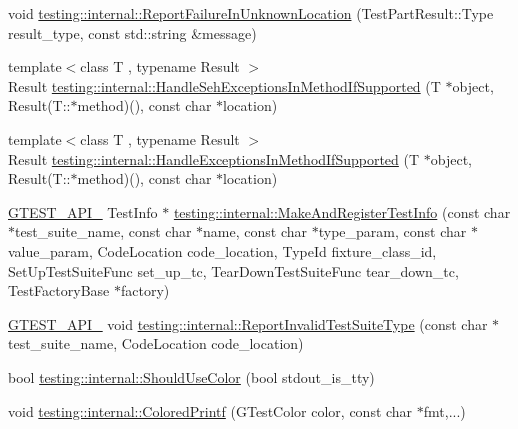 \begin{DoxyCompactItemize}
\item 
void \mbox{\hyperlink{namespacetesting_1_1internal_a85f6ff0e40f9a5f10af66a73cf1364fa}{testing\+::internal\+::\+Report\+Failure\+In\+Unknown\+Location}} (Test\+Part\+Result\+::\+Type result\+\_\+type, const std\+::string \&message)
\item 
{\footnotesize template$<$class T , typename Result $>$ }\\Result \mbox{\hyperlink{namespacetesting_1_1internal_ac5293b438139ef7ed05cb7fcaaf63545}{testing\+::internal\+::\+Handle\+Seh\+Exceptions\+In\+Method\+If\+Supported}} (T $\ast$object, Result(T\+::$\ast$method)(), const char $\ast$location)
\item 
{\footnotesize template$<$class T , typename Result $>$ }\\Result \mbox{\hyperlink{namespacetesting_1_1internal_addb2ed165b92b74e25fe9ebe9e46b9f9}{testing\+::internal\+::\+Handle\+Exceptions\+In\+Method\+If\+Supported}} (T $\ast$object, Result(T\+::$\ast$method)(), const char $\ast$location)
\item 
\mbox{\hyperlink{_obj__test_2lib_2googletest-release-1_88_81_2googletest_2include_2gtest_2internal_2gtest-port_8h_aa73be6f0ba4a7456180a94904ce17790}{G\+T\+E\+S\+T\+\_\+\+A\+P\+I\+\_\+}} Test\+Info $\ast$ \mbox{\hyperlink{namespacetesting_1_1internal_a82087d14f1d2e6b1930237a644658d3a}{testing\+::internal\+::\+Make\+And\+Register\+Test\+Info}} (const char $\ast$test\+\_\+suite\+\_\+name, const char $\ast$name, const char $\ast$type\+\_\+param, const char $\ast$value\+\_\+param, Code\+Location code\+\_\+location, Type\+Id fixture\+\_\+class\+\_\+id, Set\+Up\+Test\+Suite\+Func set\+\_\+up\+\_\+tc, Tear\+Down\+Test\+Suite\+Func tear\+\_\+down\+\_\+tc, Test\+Factory\+Base $\ast$factory)
\item 
\mbox{\hyperlink{_obj__test_2lib_2googletest-release-1_88_81_2googletest_2include_2gtest_2internal_2gtest-port_8h_aa73be6f0ba4a7456180a94904ce17790}{G\+T\+E\+S\+T\+\_\+\+A\+P\+I\+\_\+}} void \mbox{\hyperlink{namespacetesting_1_1internal_abbc0c3f8d5ee67a39d26167138effbe8}{testing\+::internal\+::\+Report\+Invalid\+Test\+Suite\+Type}} (const char $\ast$test\+\_\+suite\+\_\+name, Code\+Location code\+\_\+location)
\item 
bool \mbox{\hyperlink{namespacetesting_1_1internal_ac1db1b4603967a6c4404f31cbbac31a6}{testing\+::internal\+::\+Should\+Use\+Color}} (bool stdout\+\_\+is\+\_\+tty)
\item 
void \mbox{\hyperlink{namespacetesting_1_1internal_a1d9493ff218e622051c53094eb54bcd6}{testing\+::internal\+::\+Colored\+Printf}} (G\+Test\+Color color, const char $\ast$fmt,...)

\end{DoxyCompactItemize}
